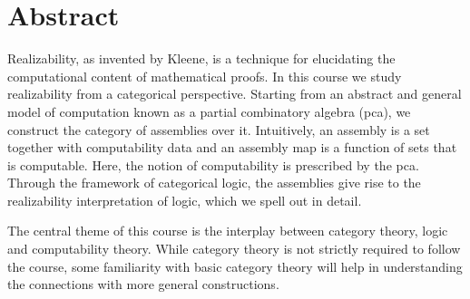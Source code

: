 \chapter{Abstract}

Realizability, as invented by Kleene, is a technique for elucidating the
computational content of mathematical proofs. In this course we study
realizability from a categorical perspective.
%
Starting from an abstract and general model of computation known as a partial
combinatory algebra (pca), we construct the category of assemblies
over it.
%
Intuitively, an assembly is a set together with computability data and an
assembly map is a function of sets that is computable. Here, the notion of
computability is prescribed by the pca.
%
Through the framework of categorical logic, the assemblies give rise to the
realizability interpretation of logic, which we spell out in detail.

The central theme of this course is the interplay between category theory, logic
and computability theory. While category theory is not strictly required to
follow the course, some familiarity with basic category theory will help in
understanding the connections with more general constructions.


